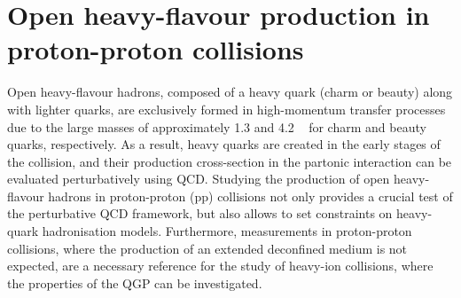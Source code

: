 \chapter{Open heavy-flavour production in proton-proton collisions}\label{ch:openHF}

Open heavy-flavour hadrons, composed of a heavy quark (charm or beauty) along with lighter quarks, are exclusively formed in high-momentum transfer processes due to the large masses of approximately 1.3 \gevcc and 4.2 \gevcc~\cite{pdg} for charm and beauty quarks, respectively. As a result, heavy quarks are created in the early stages of the collision, and their production cross-section in the partonic interaction can be evaluated perturbatively using QCD. Studying the production of open heavy-flavour hadrons in proton-proton (pp) collisions not only provides a crucial test of the perturbative QCD framework, but also allows to set constraints on heavy-quark hadronisation models. Furthermore, measurements in proton-proton collisions, where the production of an extended deconfined medium is not expected, are a necessary reference for the study of heavy-ion collisions, where the properties of the QGP can be investigated. 

